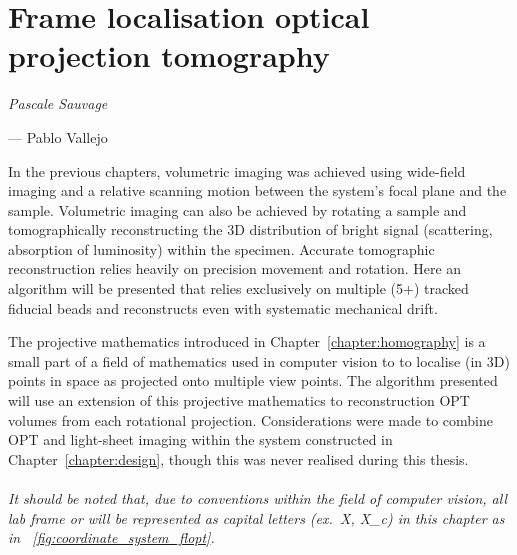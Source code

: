 \ifpdf
    \graphicspath{{Chapters/flopt/Figs/Raster/}{Chapters/flopt/Figs/PDF/}{Chapters/flopt/Figs/}}
\else
    \graphicspath{{Chapters/flopt/Figs/Vector/}{Chapters/flopt/Figs/}}
\fi


\makeatletter
\renewcommand*\env@matrix[1][*\c@MaxMatrixCols c]{%
   \hskip -\arraycolsep
   \let\@ifnextchar\new@ifnextchar
   \array{#1}}
\makeatother

\chapter{Frame localisation optical projection tomography}\label{chapter:flopt}

\epigraph{\emph{Pascale Sauvage}}{--- Pablo Vallejo}

In the previous chapters, volumetric imaging was achieved using \gls{wide-field} imaging and a relative scanning motion between the system's focal plane and the sample.
Volumetric imaging can also be achieved by rotating a sample and %
tomographically reconstructing the \gls{3D} distribution of bright signal (scattering, absorption of luminosity) within the specimen.
Accurate %
tomographic reconstruction relies
heavily on precision movement and rotation.
Here an algorithm will be presented that relies exclusively on multiple (5+) tracked fiducial beads and reconstructs even with systematic mechanical drift.

The projective mathematics introduced in Chapter~\ref{chapter:homography} is a small part of a field of mathematics used in computer vision to to localise (in \gls{3D}) points in space as projected onto multiple view points.
The algorithm presented will use an extension of this projective mathematics to reconstruction \gls{OPT} volumes from each rotational projection.
Considerations were made to combine \gls{OPT} and \gls{light-sheet} imaging within the system constructed in Chapter~\ref{chapter:design}, though this was never realised during this thesis.
\\\\
\emph{It should be noted that, due to conventions within the field of computer vision, all lab frame or  will be represented as capital letters (ex.~\gls{X}, \gls{X_c}) in this chapter as in \figurename~\ref{fig:coordinate_system_flopt}.}


